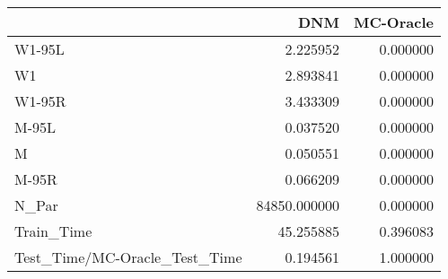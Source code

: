 \begin{tabular}{lrr}
\toprule
{} &           DNM &  MC-Oracle \\
\midrule
W1-95L                        &      2.225952 &   0.000000 \\
W1                            &      2.893841 &   0.000000 \\
W1-95R                        &      3.433309 &   0.000000 \\
M-95L                         &      0.037520 &   0.000000 \\
M                             &      0.050551 &   0.000000 \\
M-95R                         &      0.066209 &   0.000000 \\
N\_Par                         &  84850.000000 &   0.000000 \\
Train\_Time                    &     45.255885 &   0.396083 \\
Test\_Time/MC-Oracle\_Test\_Time &      0.194561 &   1.000000 \\
\bottomrule
\end{tabular}
